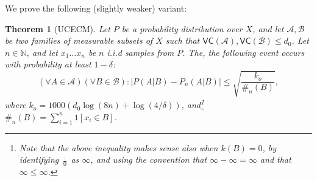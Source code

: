 \documentclass{article}
\def\B{{\mathcal B}}
\newcommand{\cA}{\mathcal{A}}
\newcommand{\cB}{\mathcal{B}}
\newtheorem{theorem}{Theorem}
\begin{document}
We prove the following (slightly weaker) variant:
\begin{theorem}[UCECM]\label{thm:UCECM}
Let $P$ be a probability distribution over $X$, and let $\cA,\cB$
be two families of measurable subsets of $X$ such that $\mathsf{VC}(\cA),\mathsf{VC}(\cB)\leq d_0$.
Let $n\in\mathbb{N}$, and let $x_1\ldots x_n$ be $n$ i.i.d samples from $P$.
The, the following event occurs with probability at least $1-\delta$:
\[\left(\forall A\in\cA\right)\left(\forall B\in\B\right):\left\lvert P(A \vert B) - P_n(A \vert B) \right\rvert \leq 
\sqrt{\frac{k_o}{\#_n(B)}},\]
where $k_o = 1000 \left(d_0 \log(8n) + \log(4/\delta)\right)$, and\footnote{Note that the above inequality makes sense also when $k(B)=0$,
by identifying $\frac{\cdot}{0}$ as $\infty$, and using the convention that $\infty-\infty=\infty$ and that $\infty\leq \infty$.} $\#_n(B) = \sum_{i=1}^n 1[x_i\in B]$.
\end{theorem}
\end{document}
